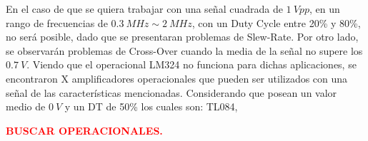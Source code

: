 En el caso de que se quiera trabajar con una señal cuadrada de $1 \ Vpp$, en un rango de frecuencias de $0.3 \ MHz \sim 2 \ MHz$, con un Duty Cycle entre 20\% y 80\%, no será posible, dado que se presentaran problemas de Slew-Rate. Por otro lado, se observarán problemas de Cross-Over cuando la media de la señal no supere los $0.7 \ V$.
Viendo que el operacional LM324 no funciona para dichas aplicaciones, se encontraron X amplificadores operacionales que pueden ser utilizados con una señal de las características mencionadas. Considerando que posean un valor medio de $0 \ V$ y un DT de 50\% los cuales son: TL084,

\begin{center}
\textcolor{red}{\textbf{BUSCAR OPERACIONALES.}}
\end{center}

